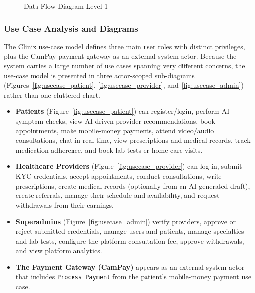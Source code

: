 \begin{figure}[H]
  \caption{Data Flow Diagram Level 1}
  \label{fig:dfd1}
\end{figure}

\subsubsection*{Use Case Analysis and Diagrams}

The Clinix use-case model defines three main user roles with distinct privileges, plus the CamPay payment gateway as an external system actor. Because the system carries a large number of use cases spanning very different concerns, the use-case model is presented in three actor-scoped sub-diagrams (Figures~\ref{fig:usecase_patient}, \ref{fig:usecase_provider}, and~\ref{fig:usecase_admin}) rather than one cluttered chart.

\begin{itemize}
  \item \textbf{Patients} (Figure~\ref{fig:usecase_patient}) can register/login, perform AI symptom checks, view AI-driven provider recommendations, book appointments, make mobile-money payments, attend video/audio consultations, chat in real time, view prescriptions and medical records, track medication adherence, and book lab tests or home-care visits.
  \item \textbf{Healthcare Providers} (Figure~\ref{fig:usecase_provider}) can log in, submit KYC credentials, accept appointments, conduct consultations, write prescriptions, create medical records (optionally from an AI-generated draft), create referrals, manage their schedule and availability, and request withdrawals from their earnings.
  \item \textbf{Superadmins} (Figure~\ref{fig:usecase_admin}) verify providers, approve or reject submitted credentials, manage users and patients, manage specialties and lab tests, configure the platform consultation fee, approve withdrawals, and view platform analytics.
  \item \textbf{The Payment Gateway (CamPay)} appears as an external system actor that includes \texttt{Process Payment} from the patient's mobile-money payment use case.
\end{itemize}


